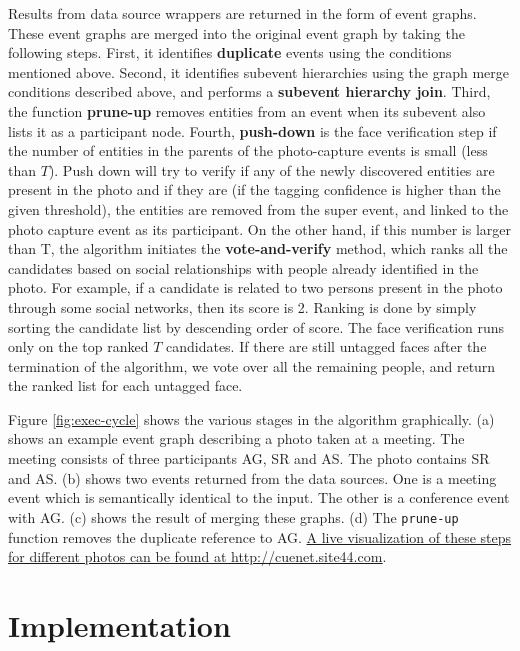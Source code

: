 Results from data source wrappers are returned in the form of event graphs. These event graphs are merged into the original event graph by taking the following steps. First, it identifies \textbf{duplicate} events using the conditions mentioned above. Second, it identifies subevent hierarchies using the graph merge conditions described above, and performs a \textbf{subevent hierarchy join}. Third, the function \textbf{prune-up} removes entities from an event when its subevent also lists it as a participant node. Fourth, \textbf{push-down} is the face verification step if the number of entities in the parents of the photo-capture events is small (less than $T$). Push down will try to verify if any of the newly discovered entities are present in the photo and if they are (if the tagging confidence is higher than the given threshold), the entities are removed from the super event, and linked to the photo capture event as its participant. On the other hand, if this number is larger than T, the algorithm initiates the \textbf{vote-and-verify} method, which ranks all the candidates based on social relationships with people already identified in the photo. For example, if a candidate is related to two persons present in the photo through some social networks, then its score is 2. Ranking is done by simply sorting the candidate list by descending order of score. The face verification runs only on the top ranked $T$ candidates. If there are still untagged faces after the termination of the algorithm, we vote over all the remaining people, and return the ranked list for each untagged face.

Figure \ref{fig:exec-cycle} shows the various stages in the algorithm graphically. (a) shows an example event graph describing a photo taken at a meeting. The meeting consists of three participants AG, SR and AS. The photo contains SR and AS. (b) shows two events returned from the data sources. One is a meeting event which is semantically identical to the input. The other is a conference event with AG. (c) shows the result of merging these graphs. (d) The \texttt{prune-up} function removes the duplicate reference to AG. \underline{A live visualization of these steps for different photos can be found at \href{http://cuenet.site44.com/}{http://cuenet.site44.com}}.

\section{Implementation}
